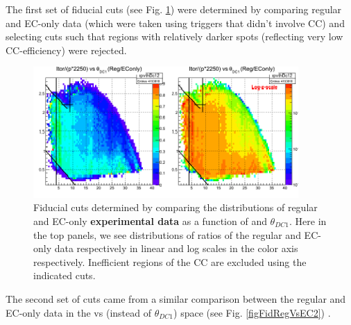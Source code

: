 The first set of fiducial cuts (see Fig. \ref{figFidRegVsEC1}) were determined by comparing regular and EC-only data (which were taken using triggers that didn't involve CC) and selecting cuts such that regions with relatively darker spots (reflecting very low CC-efficiency) were rejected.

\begin{figure}[H]%
\centering
\leavevmode \includegraphics[width=0.9\textwidth]{figuresEG4/NewP2/FidCuts/invMomVsThDc1Pass2Ebi4RatioCropped.png}
\caption[Fiducial cuts]{Fiducial cuts determined by comparing the distributions of regular and EC-only {\bf experimental data} as a function of \invP and $\theta_{DC1}$. %
Here in the top panels, we see distributions of ratios of the regular and EC-only data respectively in linear and log scales in the color axis respectively. Inefficient regions of the CC are excluded using the indicated cuts.} %
\label{figFidRegVsEC1}
\end{figure}

The second set of cuts came from a similar comparison between the regular and EC-only data in the \invP vs \thvtx (instead of $\theta_{DC1}$) space (see Fig. \ref{figFidRegVsEC2}) .

